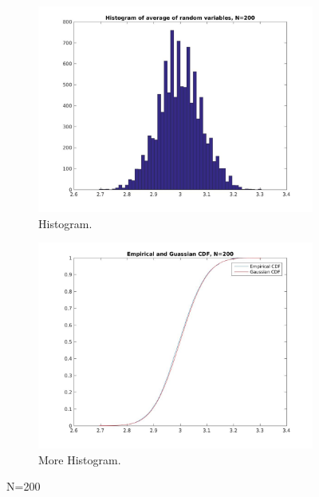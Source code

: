 \documentclass[12pt]{article}
\begin{document}
\begin{figure}[h!]
  \centering
  \begin{subfigure}[b]{0.4\linewidth}
    \includegraphics[width=\linewidth]{jpgs/histograms/200_hist.jpg}
    \caption{Histogram.}
  \end{subfigure}
  \begin{subfigure}[b]{0.4\linewidth}
    \includegraphics[width=\linewidth]{jpgs/cdfs/200_cdf.jpg}
    \caption{More Histogram.}
  \end{subfigure}
  \caption{N=200}
\end{figure}
\end{document}
